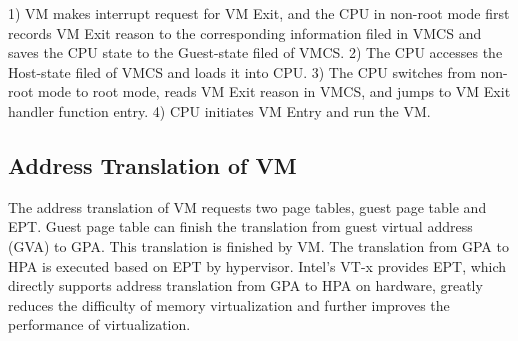 ﻿\documentclass[conference]{IEEEtran}
\begin{document}

1) VM makes interrupt request for VM Exit, and the CPU in non-root mode first records VM Exit reason to the corresponding information filed in VMCS and saves the CPU state to the Guest-state filed of VMCS.
2) The CPU accesses the Host-state filed of VMCS and loads it into CPU.
3) The CPU switches from non-root mode to root mode, reads VM Exit reason in VMCS, and jumps to VM Exit handler function entry.
4) CPU initiates VM Entry and run the VM.






\subsection{Address Translation of VM}
The address translation of VM requests two page tables, guest page table and EPT. Guest page table can finish the translation from guest virtual address (GVA) to GPA. This translation is finished by VM. The translation from GPA to HPA is executed based on EPT by hypervisor.
Intel's VT-x provides EPT, which directly supports address translation from GPA to HPA on hardware, greatly reduces the difficulty of memory virtualization and further improves the performance of virtualization.





%
%


\end{document}
